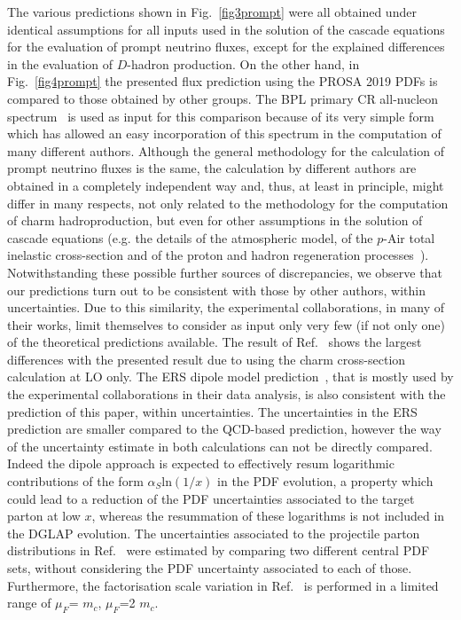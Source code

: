 The various predictions shown in Fig.~\ref{fig3prompt} were all obtained under identical assumptions for all inputs used in the solution of the cascade equations for the evaluation of prompt neutrino fluxes, except for the explained differences in the evaluation of $D$-hadron production. On the other hand, in Fig.~\ref{fig4prompt} the presented flux prediction using the PROSA 2019 PDFs is compared to those obtained by other groups. The BPL primary CR all-nucleon spectrum~\cite{Gaisser:2016uoy} is used as input for this comparison because of its very simple form which has allowed an easy incorporation of this spectrum in the computation of many different authors. Although the general methodology for the calculation of prompt neutrino fluxes is the same, the calculation by different authors are obtained in a completely independent way and, thus, at least in principle, might differ in many respects, not only related to the methodology for the computation of charm hadroproduction, but even for other assumptions in the solution of cascade equations (e.g. the details of the atmospheric model, of the $p$-Air total inelastic cross-section and of the proton and hadron regeneration processes~\cite{Garzelli:2015psa}). Notwithstanding these possible further sources of discrepancies, we observe that our predictions turn out to be consistent with those by other authors, within uncertainties. Due to this similarity, the experimental collaborations, in many of their works, limit themselves to consider as input only very few (if not only one) of the theoretical predictions available. The result of Ref.~\cite{Gondolo:1995fq} shows the largest differences with the presented result due to using the charm cross-section calculation at LO only. The ERS dipole model prediction~\cite{Enberg:2008te}, that is mostly used by the experimental collaborations in their data analysis, is also consistent with the prediction of this paper, within uncertainties. The uncertainties in the ERS prediction are smaller compared to the QCD-based prediction, however the way of the uncertainty estimate in both calculations can not be directly compared. Indeed the dipole approach is expected to effectively resum logarithmic contributions of the form $\alpha_S\mathrm{ln}(1/x)$ in the PDF evolution, a property which could lead to a reduction of the PDF uncertainties associated to the target parton at low $x$, whereas the resummation of these logarithms is not included in the DGLAP evolution.
The uncertainties associated to the projectile parton distributions in Ref.~\cite{Enberg:2008te} were estimated by comparing two different central PDF sets, without considering the PDF uncertainty associated to each of those. Furthermore, the factorisation scale variation in Ref.~\cite{Enberg:2008te} is performed in a limited range of $\mu_F$= $m_c$, $\mu_F$=2 $m_c$.

